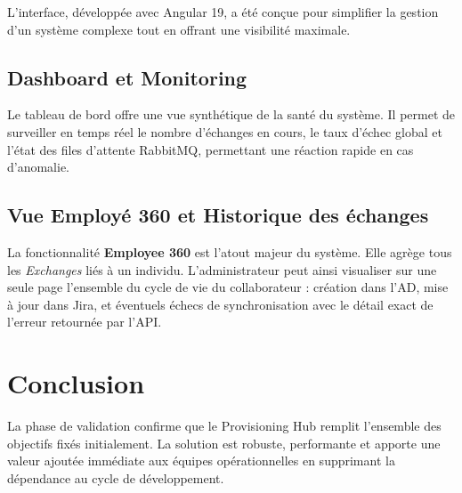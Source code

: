 L'interface, développée avec Angular 19, a été conçue pour simplifier la gestion d'un système complexe tout en offrant une visibilité maximale.

\subsection{Dashboard et Monitoring}
Le tableau de bord offre une vue synthétique de la santé du système. Il permet de surveiller en temps réel le nombre d'échanges en cours, le taux d'échec global et l'état des files d'attente RabbitMQ, permettant une réaction rapide en cas d'anomalie.

\subsection{Vue Employé 360 et Historique des échanges}
La fonctionnalité \textbf{Employee 360} est l'atout majeur du système. Elle agrège tous les \textit{Exchanges} liés à un individu. L'administrateur peut ainsi visualiser sur une seule page l'ensemble du cycle de vie du collaborateur : création dans l'AD, mise à jour dans Jira, et éventuels échecs de synchronisation avec le détail exact de l'erreur retournée par l'API.

\section{Conclusion}
La phase de validation confirme que le Provisioning Hub remplit l'ensemble des objectifs fixés initialement. La solution est robuste, performante et apporte une valeur ajoutée immédiate aux équipes opérationnelles en supprimant la dépendance au cycle de développement.
